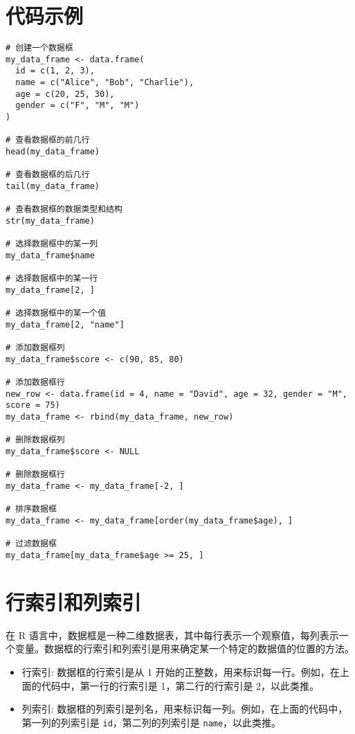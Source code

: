 \documentclass[
  letterpaper,
  DIV=11,
  numbers=noendperiod]{scrreprt}
\providecommand{\tightlist}{%
  \setlength{\itemsep}{0pt}\setlength{\parskip}{0pt}}\usepackage{longtable,booktabs,array}
\begin{document}
\hypertarget{ux4ee3ux7801ux793aux4f8b}{%
\section{代码示例}\label{ux4ee3ux7801ux793aux4f8b}}

\begin{verbatim}
# 创建一个数据框
my_data_frame <- data.frame(
  id = c(1, 2, 3),
  name = c("Alice", "Bob", "Charlie"),
  age = c(20, 25, 30),
  gender = c("F", "M", "M")
)

# 查看数据框的前几行
head(my_data_frame)

# 查看数据框的后几行
tail(my_data_frame)

# 查看数据框的数据类型和结构
str(my_data_frame)

# 选择数据框中的某一列
my_data_frame$name

# 选择数据框中的某一行
my_data_frame[2, ]

# 选择数据框中的某一个值
my_data_frame[2, "name"]

# 添加数据框列
my_data_frame$score <- c(90, 85, 80)

# 添加数据框行
new_row <- data.frame(id = 4, name = "David", age = 32, gender = "M", score = 75)
my_data_frame <- rbind(my_data_frame, new_row)

# 删除数据框列
my_data_frame$score <- NULL

# 删除数据框行
my_data_frame <- my_data_frame[-2, ]

# 排序数据框
my_data_frame <- my_data_frame[order(my_data_frame$age), ]

# 过滤数据框
my_data_frame[my_data_frame$age >= 25, ]
\end{verbatim}

\hypertarget{ux884cux7d22ux5f15ux548cux5217ux7d22ux5f15}{%
\section{行索引和列索引}\label{ux884cux7d22ux5f15ux548cux5217ux7d22ux5f15}}

在 R
语言中，数据框是一种二维数据表，其中每行表示一个观察值，每列表示一个变量。数据框的行索引和列索引是用来确定某一个特定的数据值的位置的方法。

\begin{itemize}
\tightlist
\item
  行索引: 数据框的行索引是从 1
  开始的正整数，用来标识每一行。例如，在上面的代码中，第一行的行索引是
  1，第二行的行索引是 2，以此类推。
\item
  列索引:
  数据框的列索引是列名，用来标识每一列。例如，在上面的代码中，第一列的列索引是
  \texttt{id}，第二列的列索引是 \texttt{name}，以此类推。
\end{itemize}
\end{document}

